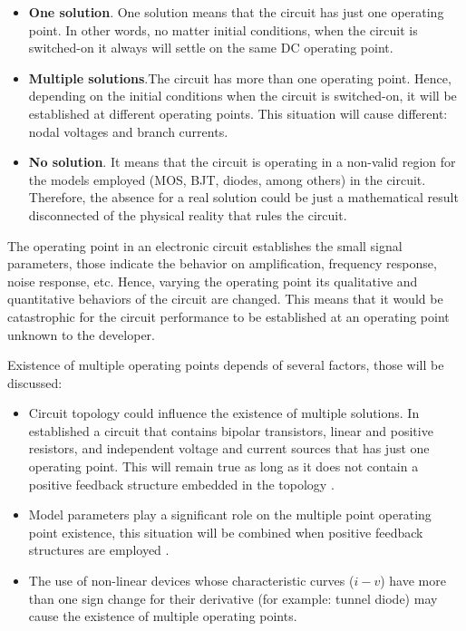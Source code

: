 \documentclass[conference,letterpaper,onecolumn]{IEEEtran}
\begin{document}
\begin{itemize}
\item {\bf One solution}. One solution means that the circuit has just one operating point. In other words, no matter initial conditions, when the circuit is switched-on it always will settle on the same DC operating point.
\item {\bf Multiple solutions}.The circuit has more than one operating point. Hence, depending on the initial conditions when the circuit is switched-on, it will be established at different operating points. This situation will cause different: nodal voltages and branch currents. 
\item {\bf No solution}. It means that the circuit is operating in a non-valid region for the models employed (MOS, BJT, diodes, among others) in the circuit. Therefore, the absence for a real solution could be just a mathematical result disconnected of the physical reality that rules the circuit.
\end{itemize}

The operating point in an electronic circuit establishes the small signal parameters, those indicate the behavior on amplification, frequency response, noise response, etc. Hence, varying the operating point its qualitative and quantitative behaviors of the circuit are changed. This means that it would be catastrophic for the circuit performance to be established at an operating point unknown to the developer.

Existence of multiple operating points depends of several factors, those will be discussed:

\begin{itemize}
\item Circuit topology could influence the existence of multiple solutions. In \cite{netwth_ns80} established a circuit that contains bipolar transistors, linear and positive resistors, and independent voltage and current sources that has just one operating point. This will remain true as long as it does not contain a positive feedback structure embedded in the topology .
\item Model parameters play a significant role on the multiple point operating point existence, this situation will be combined when positive feedback structures are employed \cite{netwth_lasr}. 
\item The use of non-linear devices whose characteristic curves ($i-v$) have more than one sign change for their derivative (for example: tunnel diode) may cause the existence of multiple operating points\cite{netwth_lasr}.
\end{itemize}
\end{document}
